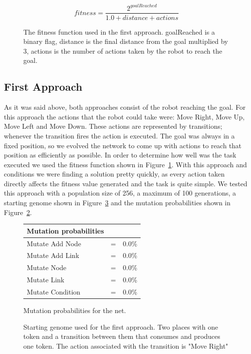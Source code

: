 \documentclass[12pt,a4paper,twocolumn]{article}
\begin{document}
\begin{figure}
\[fitness = \frac{2^{goalReached}}{1.0 + distance + actions}\]
\caption{The fitness function used in the first approach. goalReached is a binary flag, distance is the final distance from the goal multiplied by 3, actions is the number of actions taken by the robot to reach the goal.}
\label{eq:fitnessFunction}
\end{figure}


\subsection{First Approach}
\label{subsec:firstApproach}
As it was said above, both approaches consist of the robot reaching the goal. For this approach the actions that the robot could take were: Move Right, Move Up, Move Left and Move Down. These actions are represented by transitions; whenever the transition fires the action is executed. The goal was always in a fixed position, so we evolved the network to come up with actions to reach that position as efficiently as possible. In order to determine how well was the task executed we used the fitness function shown in Figure~\ref{eq:fitnessFunction}. With this approach and conditions we were finding a solution pretty quickly, as every action taken directly affects the fitness value generated and the task is quite simple. We tested this approach with a population size of 256, a maximum of 100 generations, a starting genome shown in Figure~\ref{fig:genome} and the mutation probabilities shown in Figure~\ref{tab:probabilities}. 

\begin{figure} [b]
\centering
\begin{tabular}{|l c r|}
\hline
Mutation probabilities & & \\ \hline
Mutate Add Node & = & 0.0\% \\
Mutate Add Link & = & 0.0\% \\
Mutate Node & = & 0.0\% \\
Mutate Link & = & 0.0\% \\
Mutate Condition & = & 0.0\% \\
\hline
\end{tabular}
\caption{Mutation probabilities for the net.}
\label{tab:probabilities}
\end{figure}

\begin{figure} [h]
\centering
\caption{Starting genome used for the first approach. Two places with one token and a transition between them that consumes and produces one token. The action associated with the transition is "Move Right"}
\label{fig:genome}
\end{figure}
\end{document}
